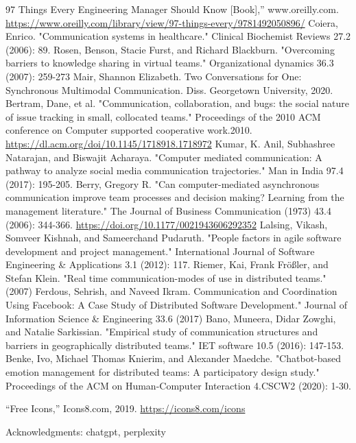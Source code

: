 \documentclass{llncs}
\begin{document}
\begin{thebibliography}{8}
97 Things Every Engineering Manager Should Know [Book],” www.oreilly.com.
\url{https://www.oreilly.com/library/view/97-things-every/9781492050896/}
‌
Coiera, Enrico. "Communication systems in healthcare." Clinical Biochemist Reviews 27.2 (2006): 89.
Rosen, Benson, Stacie Furst, and Richard Blackburn. "Overcoming barriers to knowledge sharing in virtual teams." Organizational dynamics 36.3 (2007): 259-273
Mair, Shannon Elizabeth. Two Conversations for One: Synchronous Multimodal Communication. Diss. Georgetown University, 2020.
Bertram, Dane, et al. "Communication, collaboration, and bugs: the social nature of issue tracking in small, collocated teams." Proceedings of the 2010 ACM conference on Computer supported cooperative work.2010. \url{https://dl.acm.org/doi/10.1145/1718918.1718972}
Kumar, K. Anil, Subhashree Natarajan, and Biswajit Acharaya. "Computer mediated communication: A pathway to analyze social media communication trajectories." Man in India 97.4 (2017): 195-205.
Berry, Gregory R. "Can computer-mediated asynchronous communication improve team processes and decision making? Learning from the management literature." The Journal of Business Communication (1973) 43.4 (2006): 344-366. \url{https://doi.org/10.1177/0021943606292352}
Lalsing, Vikash, Somveer Kishnah, and Sameerchand Pudaruth. "People factors in agile software development and project management." International Journal of Software Engineering \& Applications 3.1 (2012): 117.
Riemer, Kai, Frank Frößler, and Stefan Klein. "Real time communication-modes of use in distributed teams." (2007)
Ferdous, Sehrish, and Naveed Ikram. Communication and Coordination Using Facebook: A Case Study of Distributed Software Development." Journal of Information Science \& Engineering 33.6 (2017)
Bano, Muneera, Didar Zowghi, and Natalie Sarkissian. "Empirical study of communication structures and barriers in geographically distributed teams." IET software 10.5 (2016): 147-153.
Benke, Ivo, Michael Thomas Knierim, and Alexander Maedche. "Chatbot-based emotion management for distributed teams: A participatory design study." Proceedings of the ACM on Human-Computer Interaction 4.CSCW2 (2020): 1-30.

“Free Icons,” Icons8.com, 2019. \url{https://icons8.com/icons}

Acknowledgments: chatgpt, perplexity
\end{thebibliography}
\end{document}
